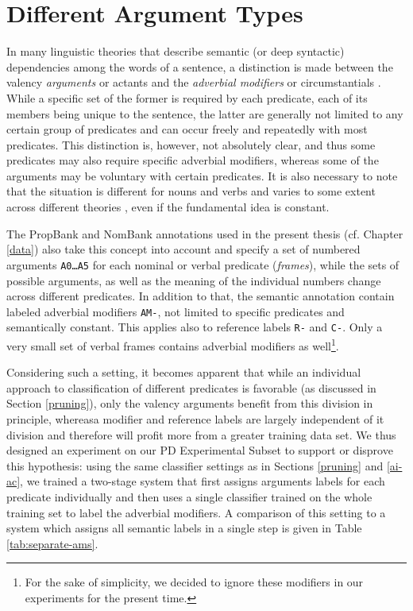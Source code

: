 \documentclass[12pt,notitlepage]{report}
\begin{document}
\section{Different Argument Types}\label{arg-types}

In many linguistic theories that describe semantic (or deep syntactic) dependencies among the words of a sentence, a distinction is made between the valency \emph{arguments} or actants and the \emph{adverbial modifiers} or circumstantials \citep[p. 100ff.]{sgal86}. While a specific set of the former is required by each predicate, each of its members being unique to the sentence, the latter are generally not limited to any certain group of predicates and can occur freely and repeatedly with most predicates. This distinction is, however, not absolutely clear, and thus some predicates may also require specific adverbial modifiers, whereas some of the arguments may be voluntary with certain predicates. It is also necessary to note that the situation is different for nouns and verbs and varies to some extent across different theories \citep{rambow03}, even if the fundamental idea is constant.

The PropBank \citep{kinsbury02,palmer05} and NomBank \citep{meyers04} annotations used in the present thesis (cf. Chapter \ref{data}) also take this concept into account and specify a set of numbered arguments \texttt{A0\dots A5} for each nominal or verbal predicate (\emph{frames}), while the sets of possible arguments, as well as the meaning of the individual numbers change across different predicates. In addition to that, the semantic annotation contain labeled adverbial modifiers \texttt{AM-}, not limited to specific predicates and semantically constant. This applies also to reference labels \texttt{R-} and \texttt{C-}. Only a very small set of verbal frames contains adverbial modifiers as well\footnote{For the sake of simplicity, we decided to ignore these modifiers in our experiments for the present time.}.

Considering such a setting, it becomes apparent that while an individual approach to classification of different predicates is favorable (as discussed in Section \ref{pruning}), only the valency arguments benefit from this division in principle, whereasa modifier and reference labels are largely independent of it division and therefore will profit more from a greater training data set. We thus designed an experiment on our PD Experimental Subset to support or disprove this hypothesis: using the same classifier settings as in Sections \ref{pruning} and \ref{ai-ac}, we trained a two-stage system that first assigns arguments labels for each predicate individually and then uses a single classifier trained on the whole training set to label the adverbial modifiers. A comparison of this setting to a system which assigns all semantic labels in a single step is given in Table \ref{tab:separate-ams}.
\end{document}
